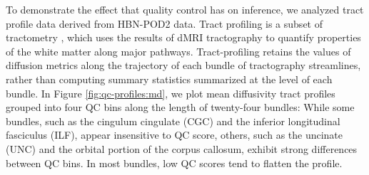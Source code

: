 \documentclass[fleqn,10pt]{wlscirep}
\begin{document}
To demonstrate the effect that quality control has on inference, we analyzed
tract profile data derived from HBN-POD2 data. Tract profiling
\cite{yeatman2012-rc,jones2005pasta,colby2012along,odonnell2009tract,
kruper2021evaluating} is a subset of tractometry
\cite{jones2005pasta,bells2011tractometry}, which uses the results of dMRI
tractography to quantify properties of the white matter along major pathways.
Tract-profiling retains the values of diffusion metrics along the trajectory of
each bundle of tractography streamlines, rather than computing summary
statistics summarized at the level of each bundle. In Figure
\ref{fig:qc-profiles:md}, we plot mean diffusivity tract profiles grouped into
four QC bins along the length of twenty-four bundles: While some bundles, such
as the cingulum cingulate (CGC) and the inferior longitudinal fasciculus (ILF),
appear insensitive to QC score, others, such as the uncinate (UNC) and the
orbital portion of the corpus callosum, exhibit strong differences between QC
bins. In most bundles, low QC scores tend to flatten the profile.
\end{document}
